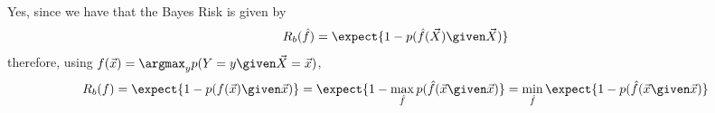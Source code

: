 Yes, since we have that the Bayes Risk is given by
\begin{equation*}
    R_b(\hat{f}) = \expect{1 - p(\hat{f}(\vec{X}) \given \vec{X})}
\end{equation*}
therefore, using $f(\vec{x}) = \argmax_y p(Y=y \given \vec{X} = \vec{x})$,
\begin{equation*}
    R_b(f) = \expect{1 - p(f(\vec{x}) \given \vec{x})} = \expect{1 - \max_{\hat{f}} p(\hat{f}(\vec{x} \given \vec{x})} = \min_{\hat{f}} \expect{1 - p(\hat{f}(\vec{x} \given \vec{x})} 
\end{equation*}